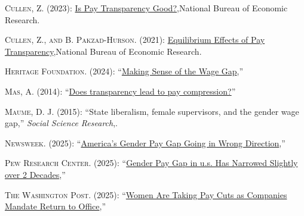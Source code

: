 \documentclass[
  letterpaper,
  DIV=11,
  numbers=noendperiod]{scrartcl}
\newlength{\cslhangindent}
\newenvironment{CSLReferences}[2] %
 {\begin{list}{}{%
  \setlength{\itemindent}{0pt}
  \setlength{\leftmargin}{0pt}
  \setlength{\parsep}{0pt}
  \ifodd #1
   \setlength{\leftmargin}{\cslhangindent}
   \setlength{\itemindent}{-1\cslhangindent}
  \fi
  \setlength{\itemsep}{#2\baselineskip}}}
 {\end{list}}
\begin{document}
\begin{CSLReferences}{1}{1}
\textsc{Cullen, Z.} (2023):
\href{https://www.nber.org/system/files/working_papers/w31060/w31060.pdf}{Is
Pay Transparency Good?},National Bureau of Economic Research.

\textsc{Cullen, Z., and B. Pakzad-Hurson}. (2021):
\href{https://www.nber.org/system/files/working_papers/w28903/revisions/w28903.rev0.pdf}{Equilibrium
Effects of Pay Transparency},National Bureau of Economic Research.

\textsc{Heritage Foundation}. (2024):
{``\href{https://www.heritage.org/jobs-and-labor/commentary/making-sense-the-wage-gap}{Making
Sense of the Wage Gap},''}

\textsc{Mas, A.} (2014):
{``\href{https://www.nber.org/system/files/working_papers/w20558/w20558.pdf}{Does
transparency lead to pay compression?}''}

\textsc{Maume, D. J.} (2015): {``State liberalism, female supervisors,
and the gender wage gap,''} \emph{Social Science Research},.

\textsc{Newsweek}. (2025):
{``\href{https://www.newsweek.com/americas-gender-pay-gap-going-wrong-direction-10739408}{America's
Gender Pay Gap Going in Wrong Direction},''}

\textsc{Pew Research Center}. (2025):
{``\href{https://www.pewresearch.org/short-reads/2025/03/04/gender-pay-gap-in-us-has-narrowed-slightly-over-2-decades/}{Gender
Pay Gap in u.s. Has Narrowed Slightly over 2 Decades},''}

\textsc{The Washington Post}. (2025):
{``\href{https://www.washingtonpost.com/business/2025/10/11/rto-mandates-gender-wage-gap/}{Women
Are Taking Pay Cuts as Companies Mandate Return to Office},''}

\end{CSLReferences}
\end{document}
